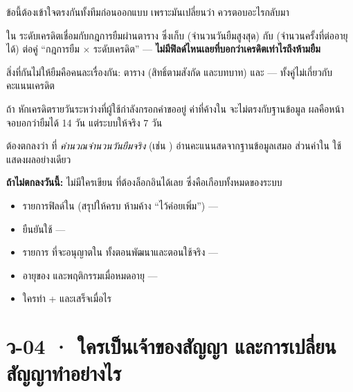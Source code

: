 \begin{keybox}[title={เครดิตต่ำ \emph{ไม่ได้} แปลว่ายืมไม่ได้ --- แปลว่ายืมได้สั้นลง}]
ข้อนี้ต้องเข้าใจตรงกันทั้งทีมก่อนออกแบบ  เพราะมันเปลี่ยนว่า
 ควรตอบอะไรกลับมา

ใน  ระดับเครดิตเชื่อมกับกฎการยืมผ่านตาราง
 ซึ่งเก็บ  (จำนวนวันยืมสูงสุด) กับ
 (จำนวนครั้งที่ต่ออายุได้) ต่อคู่ ``กฎการยืม $\times$
ระดับเครดิต'' --- \textbf{ไม่มีฟิลด์ไหนเลยที่บอกว่าเครดิตเท่าไรถึงห้ามยืม}

สิ่งที่กันไม่ให้ยืมคือคนละเรื่องกัน: ตาราง  (สิทธิ์ตามสังกัด
และบทบาท) และ  --- ทั้งคู่ไม่เกี่ยวกับคะแนนเครดิต
\end{keybox}

\begin{warnbox}[title={\code{creditScore} ใน \code{ctx} เสี่ยงเป็นข้อมูลเก่า}]
ถ้า  หักเครดิตรายวันระหว่างที่ผู้ใช้กำลังกรอกคำขออยู่ ค่าที่ค้างใน
 จะไม่ตรงกับฐานข้อมูล ผลคือหน้าจอบอกว่ายืมได้ 14 วัน แต่ระบบให้จริง 7 วัน

ต้องตกลงว่า  ที่ \emph{คำนวณจำนวนวันยืมจริง} (เช่น
) อ่านคะแนนสดจากฐานข้อมูลเสมอ ส่วนค่าใน 
ใช้แสดงผลอย่างเดียว
\end{warnbox}

\textbf{ถ้าไม่ตกลงวันนี้:} ไม่มีใครเขียน  ที่ต้องล็อกอินได้เลย
ซึ่งคือเกือบทั้งหมดของระบบ

\begin{outbox}
\begin{itemize}
\item รายการฟิลด์ใน  (สรุปให้ครบ ห้ามค้าง ``ไว้ค่อยเพิ่ม'') ---
\item ยืนยันใช้  ---
\item รายการ  ที่จะอนุญาตใน  ทั้งตอนพัฒนาและตอนใช้จริง ---
\item อายุของ  และพฤติกรรมเมื่อหมดอายุ ---
\item ใครทำ  +  และเสร็จเมื่อไร
\end{itemize}
\end{outbox}

\section{ว-04 · ใครเป็นเจ้าของสัญญา และการเปลี่ยนสัญญาทำอย่างไร}

